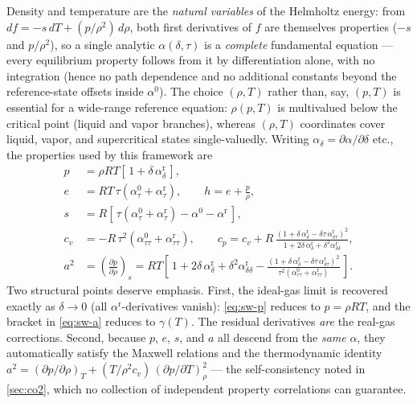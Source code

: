 \documentclass[11pt]{article}
\newcommand{\pd}[2]{\frac{\partial #1}{\partial #2}}
\begin{document}
Density and temperature are the \emph{natural variables} of the
Helmholtz energy: from
$df = -s\,dT + (p/\rho^2)\,d\rho$, both first derivatives of $f$ are
themselves properties ($-s$ and $p/\rho^2$), so a single analytic
$\alpha(\delta,\tau)$ is a \emph{complete} fundamental equation ---
every equilibrium property follows from it by differentiation alone,
with no integration (hence no path dependence and no additional
constants beyond the reference-state offsets inside $\alpha^0$). The
choice $(\rho, T)$ rather than, say, $(p, T)$ is essential for a
wide-range reference equation: $\rho(p,T)$ is multivalued below the
critical point (liquid and vapor branches), whereas $(\rho, T)$
coordinates cover liquid, vapor, and supercritical states
single-valuedly. Writing
$\alpha_\delta = \partial\alpha/\partial\delta$ etc., the properties
used by this framework are
\begin{align}
p &= \rho R T \left[\, 1 + \delta\,\alpha^{\mathrm{r}}_{\delta}
 \,\right],
\label{eq:sw-p}\\
e &= R T\,\tau \left(\alpha^{0}_{\tau} +
 \alpha^{\mathrm{r}}_{\tau}\right),
\qquad h = e + \frac{p}{\rho},
\label{eq:sw-e}\\
s &= R \left[\, \tau\left(\alpha^{0}_{\tau} +
 \alpha^{\mathrm{r}}_{\tau}\right) - \alpha^{0} -
 \alpha^{\mathrm{r}} \,\right],
\label{eq:sw-s}\\
c_v &= -R\,\tau^{2} \left(\alpha^{0}_{\tau\tau} +
 \alpha^{\mathrm{r}}_{\tau\tau}\right),
\qquad
c_p = c_v + R\,\frac{\left(1 + \delta\,\alpha^{\mathrm{r}}_{\delta}
 - \delta\tau\,\alpha^{\mathrm{r}}_{\delta\tau}\right)^{2}}
 {1 + 2\delta\,\alpha^{\mathrm{r}}_{\delta} +
 \delta^{2}\alpha^{\mathrm{r}}_{\delta\delta}},
\label{eq:sw-cv}\\
a^{2} &= \left(\pd{p}{\rho}\right)_{\!s}
 = R T \left[\, 1 + 2\delta\,\alpha^{\mathrm{r}}_{\delta}
 + \delta^{2}\alpha^{\mathrm{r}}_{\delta\delta}
 - \frac{\left(1 + \delta\,\alpha^{\mathrm{r}}_{\delta}
 - \delta\tau\,\alpha^{\mathrm{r}}_{\delta\tau}\right)^{2}}
 {\tau^{2}\left(\alpha^{0}_{\tau\tau} +
 \alpha^{\mathrm{r}}_{\tau\tau}\right)} \,\right].
\label{eq:sw-a}
\end{align}
Two structural points deserve emphasis. First, the ideal-gas limit is
recovered exactly as $\delta \to 0$ (all
$\alpha^{\mathrm{r}}$-derivatives vanish): \cref{eq:sw-p} reduces to
$p = \rho R T$, and the bracket in \cref{eq:sw-a} reduces to
$\gamma(T)$. The residual derivatives \emph{are} the real-gas
corrections. Second, because $p$, $e$, $s$, and $a$ all descend from
the \emph{same} $\alpha$, they automatically satisfy the Maxwell
relations and the thermodynamic identity
$a^2 = (\partial p/\partial\rho)_T + (T/\rho^2 c_v)\,
(\partial p/\partial T)_\rho^2$ --- the self-consistency noted in
\cref{sec:co2}, which no collection of independent property
correlations can guarantee.
\end{document}
